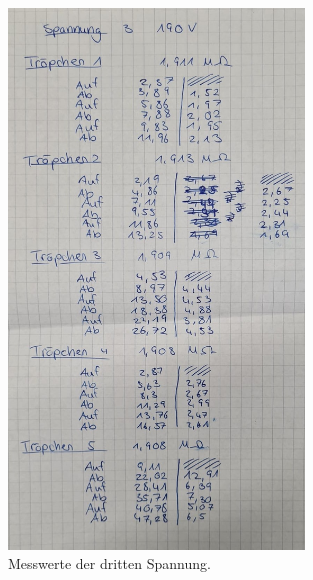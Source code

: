 \begin{figure}
    \centering
    \includegraphics[width=0.7\textwidth]{bilder/Spannung3.jpg}
    \caption{Messwerte der dritten Spannung.}
\end{figure}

